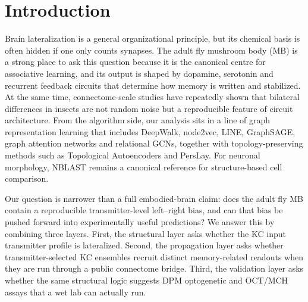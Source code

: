 \documentclass[10pt]{article}
\begin{document}
\section*{Introduction}
Brain lateralization is a general organizational principle, but its chemical basis is often hidden if one only counts synapses. The adult fly mushroom body (MB) is a strong place to ask this question because it is the canonical centre for associative learning, and its output is shaped by dopamine, serotonin and recurrent feedback circuits that determine how memory is written and stabilized\cite{aso2014mushroom,modi2020dopamine_kc,keene2006dpm,waddell2013serotonin}. At the same time, connectome-scale studies have repeatedly shown that bilateral differences in insects are not random noise but a reproducible feature of circuit architecture\cite{scheffer2020hemibrain,li2020kc_subtypes,karolis2019lateralisation,pedigo2023bilateral_elife,winding2023larva}. From the algorithm side, our analysis sits in a line of graph representation learning that includes DeepWalk, node2vec, LINE, GraphSAGE, graph attention networks and relational GCNs, together with topology-preserving methods such as Topological Autoencoders and PersLay\cite{deepwalk2014,node2vec2016,line2015,graphsage2017,gcn2017,gat2018,rgcn2018,topoautoenc2020,perslay2020}. For neuronal morphology, NBLAST remains a canonical reference for structure-based cell comparison\cite{costa2016nblast}.

Our question is narrower than a full embodied-brain claim: does the adult fly MB contain a reproducible transmitter-level left--right bias, and can that bias be pushed forward into experimentally useful predictions? We answer this by combining three layers. First, the structural layer asks whether the KC input transmitter profile is lateralized. Second, the propagation layer asks whether transmitter-selected KC ensembles recruit distinct memory-related readouts when they are run through a public connectome bridge. Third, the validation layer asks whether the same structural logic suggests DPM optogenetic and OCT/MCH assays that a wet lab can actually run.

\end{document}
